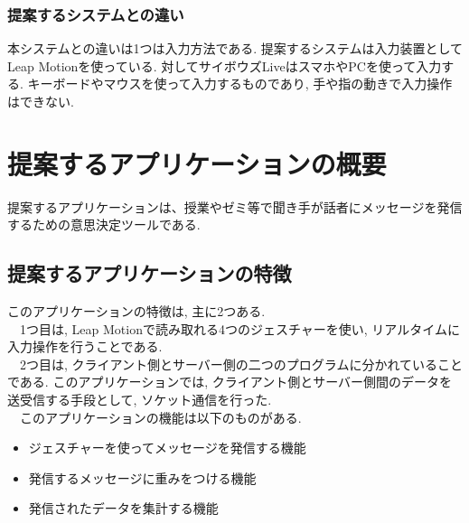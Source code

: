 \documentclass{funthesis}
\begin{document}
\subsection{提案するシステムとの違い}
本システムとの違いは1つは入力方法である. 提案するシステムは入力装置としてLeap Motionを使っている. 対してサイボウズLiveはスマホやPCを使って入力する. キーボードやマウスを使って入力するものであり, 手や指の動きで入力操作はできない. 

\chapter{提案するアプリケーションの概要}

提案するアプリケーションは、授業やゼミ等で聞き手が話者にメッセージを発信するための意思決定ツールである. 

\section{提案するアプリケーションの特徴}


このアプリケーションの特徴は, 主に2つある.\\
　1つ目は, Leap Motionで読み取れる4つのジェスチャーを使い, リアルタイムに入力操作を行うことである. \\
　2つ目は, クライアント側とサーバー側の二つのプログラムに分かれていることである. このアプリケーションでは, クライアント側とサーバー側間のデータを送受信する手段として, ソケット通信を行った. \\
　このアプリケーションの機能は以下のものがある.
\begin{itemize}
 \item ジェスチャーを使ってメッセージを発信する機能
 \item 発信するメッセージに重みをつける機能
 \item 発信されたデータを集計する機能
\end{itemize}
\end{document}
